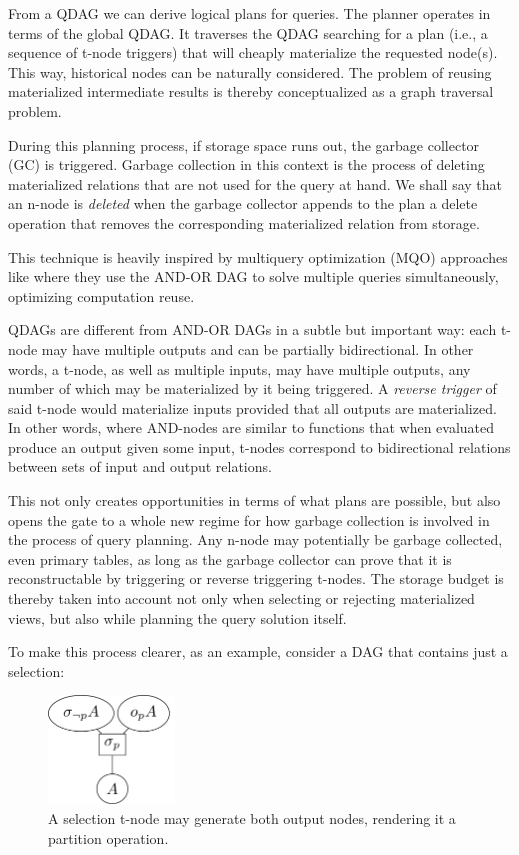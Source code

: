 From a QDAG we can derive logical plans for queries. The planner
operates in terms of the global QDAG. It traverses the QDAG searching
for a plan (i.e., a sequence of t-node triggers) that will cheaply
materialize the requested node(s). This way, historical nodes can be
naturally considered. The problem of reusing materialized intermediate
results is thereby conceptualized as a graph traversal problem.

During this planning process, if storage space runs out, the garbage
collector (GC) is triggered. Garbage collection in this context is the
process of deleting materialized relations that are not used for the
query at hand. We shall say that an n-node is \emph{deleted} when the
garbage collector appends to the plan a delete operation that removes
the corresponding materialized relation from storage.

This technique is
heavily inspired by multiquery optimization (MQO) approaches like
\cite{mistryMaterializedViewSelection2001} where they use the AND-OR DAG
to solve multiple queries simultaneously, optimizing computation reuse.

QDAGs are different from AND-OR DAGs in a subtle but important way:
each t-node may have multiple outputs and can be partially
bidirectional. In other words, a t-node, as well as multiple inputs,
may have multiple outputs, any number of which may be materialized by
it being triggered. A \emph{reverse trigger} of said t-node would
materialize inputs provided that all outputs are materialized. In
other words, where AND-nodes are similar to functions that when
evaluated produce an output given some input, t-nodes correspond to
bidirectional relations between sets of input and output
relations.

This not only creates opportunities in terms of what plans
are possible, but also opens the gate to a whole new regime for how
garbage collection is involved in the process of query planning. Any
n-node may potentially be garbage collected, even primary tables, as
long as the garbage collector can prove that it is reconstructable by
triggering or reverse triggering t-nodes. The storage budget is
thereby taken into account not only when selecting or rejecting
materialized views, but also while planning the query solution
itself.

To make this process clearer, as an example, consider a DAG that
contains just a selection:

\begin{figure}[H]
  \centering
  \includegraphics[width=0.3\textwidth]{./imgs/selnet.pdf}
  \caption{A selection t-node may generate both output nodes,
    rendering it a partition operation.}
\end{figure}


